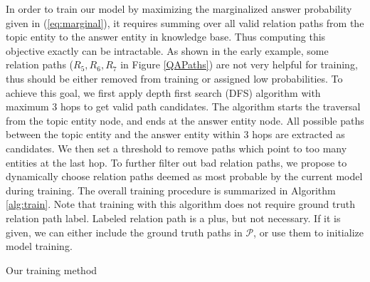 In order to train our model by maximizing the marginalized answer probability given in (\ref{eq:marginal}), it requires summing over all valid relation paths from the topic entity to the answer entity in knowledge base. Thus computing this objective exactly can be intractable. As shown in the early example, some relation paths ($R_5, R_6, R_7$ in Figure \ref{QAPaths}) are not very helpful for training, thus should be either removed from training or assigned low probabilities. To achieve this goal, we first apply depth first search (DFS) algorithm with maximum 3 hops to get valid path candidates. The algorithm starts the traversal from the topic entity node, and ends at the answer entity node. All possible paths between the topic entity and the answer entity within 3 hops are extracted as candidates. We then set a threshold to remove paths which point to too many entities at the last hop. To further filter out bad relation paths, we propose to dynamically choose relation paths deemed as most probable by the current model during training. The overall training procedure is summarized in Algorithm \ref{alg:train}. Note that training with this algorithm does not require ground truth relation path label. Labeled relation path is a plus, but not necessary. If it is given, we can either include the ground truth paths in $\mathcal{P}$, or use them to initialize model training.

\begin{algorithm}

 
 \ForEach {batch}{
  \ForEach{$(q^{n},y^{n}, e_0^{n})$ in the batch}{
  Get top $k_2$ paths in $\mathcal{P}$ sorted by $p(\mathbf{p}|q)$ based on current model:
		 	$\tilde{\mathcal{P}}^n = \{{\mathbf{p}}^n_{1},\cdots,{\mathbf{p}}^n_{k_2} \}$\\
  } 
    Update model parameters by maximizing $\sum\limits_{(q^{n},y^{n}, e_0^{n}) \in \text{batch}} \log \sum\limits_{\mathbf{p} \in \tilde{\mathcal{P}}^n} p(y^{n}|\mathbf{p},q^{n}) P(\mathbf{p}|q^{n}) $
  }


 \caption{Our training method}
 \label{alg:train}
\end{algorithm}
